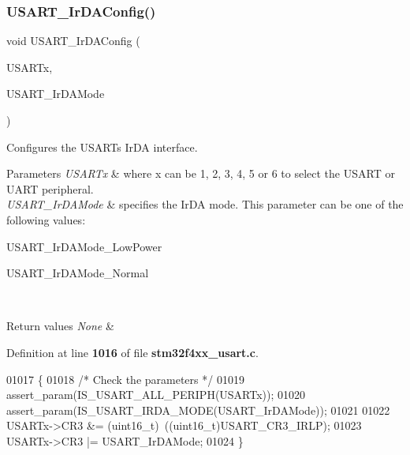 \subsubsection{U\+S\+A\+R\+T\+\_\+\+Ir\+D\+A\+Config()}
{\footnotesize\ttfamily void U\+S\+A\+R\+T\+\_\+\+Ir\+D\+A\+Config (\begin{DoxyParamCaption}\item[{\textbf{ U\+S\+A\+R\+T\+\_\+\+Type\+Def} $\ast$}]{U\+S\+A\+R\+Tx,  }\item[{uint16\+\_\+t}]{U\+S\+A\+R\+T\+\_\+\+Ir\+D\+A\+Mode }\end{DoxyParamCaption})}



Configures the U\+S\+A\+RT\textquotesingle{}s Ir\+DA interface. 


\begin{DoxyParams}{Parameters}
{\em U\+S\+A\+R\+Tx} & where x can be 1, 2, 3, 4, 5 or 6 to select the U\+S\+A\+RT or U\+A\+RT peripheral. \\
\hline
{\em U\+S\+A\+R\+T\+\_\+\+Ir\+D\+A\+Mode} & specifies the Ir\+DA mode. This parameter can be one of the following values\+: \begin{DoxyItemize}
\item U\+S\+A\+R\+T\+\_\+\+Ir\+D\+A\+Mode\+\_\+\+Low\+Power \item U\+S\+A\+R\+T\+\_\+\+Ir\+D\+A\+Mode\+\_\+\+Normal \end{DoxyItemize}
\\
\hline
\end{DoxyParams}

\begin{DoxyRetVals}{Return values}
{\em None} & \\
\hline
\end{DoxyRetVals}


Definition at line \textbf{ 1016} of file \textbf{ stm32f4xx\+\_\+usart.\+c}.


\begin{DoxyCode}
01017 \{
01018   \textcolor{comment}{/* Check the parameters */}
01019   assert_param(IS_USART_ALL_PERIPH(USARTx));
01020   assert_param(IS_USART_IRDA_MODE(USART\_IrDAMode));
01021     
01022   USARTx->CR3 &= (uint16\_t)~((uint16\_t)USART_CR3_IRLP);
01023   USARTx->CR3 |= USART\_IrDAMode;
01024 \}
\end{DoxyCode}
